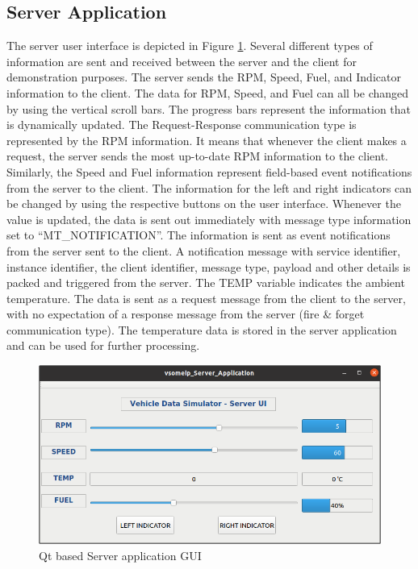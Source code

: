 \subsection{Server Application}
The server user interface is depicted in Figure \ref{fig:serverUI}. Several different types of information are sent and received between the server and the client for demonstration purposes. The server sends the RPM, Speed, Fuel, and Indicator information to the client. The data for RPM, Speed, and Fuel can all be changed by using the vertical scroll bars. The progress bars represent the information that is dynamically updated. The Request-Response communication type is represented by the RPM information. It means that whenever the client makes a request, the server sends the most up-to-date RPM information to the client. Similarly, the Speed and Fuel information represent field-based event notifications from the server to the client. The information for the left and right indicators can be changed by using the respective buttons on the user interface. Whenever the value is updated, the data is sent out immediately with message type information set to "`MT\_NOTIFICATION"'. The information is sent as event notifications from the server sent to the client. A notification message with service identifier, instance identifier, the client identifier, message type, payload and other details is packed and triggered from the server. The TEMP variable indicates the ambient temperature. The data is sent as a request message from the client to the server, with no expectation of a response message from the server (fire \& forget communication type). The temperature data is stored in the server application and can be used for further processing.

\begin{figure}[!htb]
	\centering
		\includegraphics[width=1\textwidth]{images/serverUI.png}
	\caption{Qt based Server application GUI}
	\label{fig:serverUI}
\end{figure}

